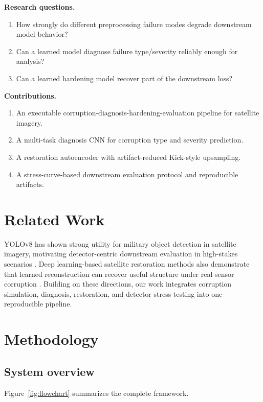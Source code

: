 \documentclass[11pt]{article}
\begin{document}
\textbf{Research questions.}
\begin{enumerate}
\item How strongly do different preprocessing failure modes degrade downstream model behavior?
\item Can a learned model diagnose failure type/severity reliably enough for analysis?
\item Can a learned hardening model recover part of the downstream loss?
\end{enumerate}

\textbf{Contributions.}
\begin{enumerate}
\item An executable corruption-diagnosis-hardening-evaluation pipeline for satellite imagery.
\item A multi-task diagnosis CNN for corruption type and severity prediction.
\item A restoration autoencoder with artifact-reduced Kick-style upsampling.
\item A stress-curve-based downstream evaluation protocol and reproducible artifacts.
\end{enumerate}

\section{Related Work}
YOLOv8 has shown strong utility for military object detection in satellite imagery, motivating detector-centric downstream evaluation in high-stakes scenarios \cite{prathyusha2025yolo}. Deep learning-based satellite restoration methods also demonstrate that learned reconstruction can recover useful structure under real sensor corruption \cite{sensors2022landsat}. Building on these directions, our work integrates corruption simulation, diagnosis, restoration, and detector stress testing into one reproducible pipeline.

\section{Methodology}
\subsection{System overview}
Figure~\ref{fig:flowchart} summarizes the complete framework.
\end{document}
